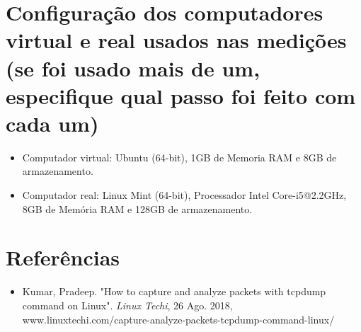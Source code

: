 \documentclass[12pt,letterpaper]{article}
\begin{document}
\section{Configuração dos computadores virtual e real usados nas
medições (se foi usado mais de um, especifique qual passo foi feito
com cada um)}

\begin{itemize}
    \item Computador virtual: Ubuntu (64-bit), 1GB de Memoria RAM e 8GB de armazenamento.
    \item Computador real: Linux Mint (64-bit), Processador Intel Core-i5@2.2GHz, 8GB de Memória RAM e 128GB de armazenamento.
\end{itemize}


\section{Referências}

\begin{itemize}
   \item Kumar, Pradeep. "How to capture and analyze packets with tcpdump command on Linux". \textit{Linux Techi}, 26 Ago. 2018, www.linuxtechi.com/capture-analyze-packets-tcpdump-command-linux/
\end{itemize}
\end{document}
